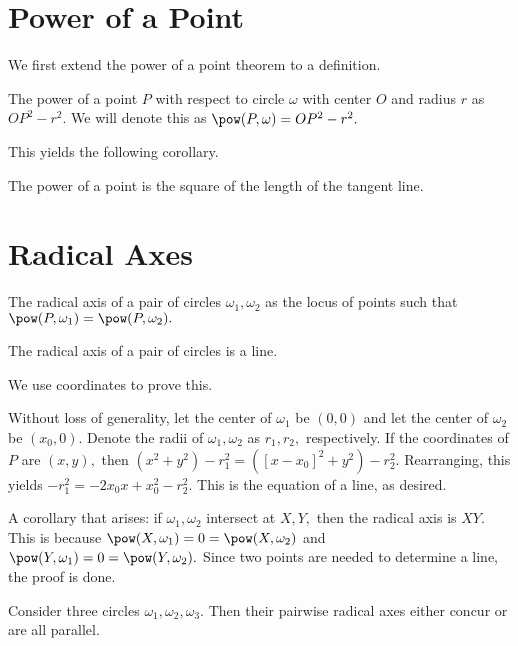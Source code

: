 \section{Power of a Point}
We first extend the power of a point theorem to a definition.
\begin{defi}
The power of a point $P$ with respect to circle $\omega$ with center $O$ and radius $r$ as $OP^2-r^2.$ We will denote this as $\pow(P,\omega)=OP^2-r^2.$
\end{defi}
This yields the following corollary.
\begin{fact}
The power of a point is the square of the length of the tangent line.
\end{fact}
\section{Radical Axes}
\begin{defi}
The radical axis of a pair of circles $\omega_1,\omega_2$ as the locus of points such that $\pow(P,\omega_1)=\pow(P,\omega_2).$
\end{defi}

\begin{theo}
The radical axis of a pair of circles is a line.
\end{theo}

\begin{pro}
We use coordinates to prove this.

Without loss of generality, let the center of $\omega_1$ be $(0,0)$ and let the center of $\omega_2$ be $(x_{0},0).$ Denote the radii of $\omega_1,\omega_2$ as $r_1,r_2,$ respectively. If the coordinates of $P$ are $(x,y),$ then $(x^2+y^2)-r_1^2=([x-x_{0}]^2+y^2)-r_2^2.$ Rearranging, this yields $-r_1^2=-2x_{0}x+x^2_{0}-r_2^2.$ This is the equation of a line, as desired. 
\end{pro}

A corollary that arises: if $\omega_1,\omega_2$ intersect at $X,Y,$ then the radical axis is $XY.$ This is because $\pow(X,\omega_1)=0=\pow(X,\omega_2)$ and $\pow(Y,\omega_1)=0=\pow(Y,\omega_2).$ Since two points are needed to determine a line, the proof is done.

\begin{theo}
Consider three circles $\omega_1,\omega_2,\omega_3.$ Then their pairwise radical axes either concur or are all parallel.
\end{theo}

